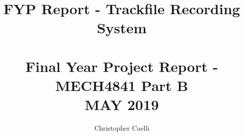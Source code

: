 \documentclass{UoNMCHA}
\numberwithin{equation}{section}
\begin{document}
\title{FYP Report - Trackfile Recording System \\ \ \\
{\small Final Year Project Report - MECH4841 Part B  \\MAY 2019}}
\author[UoNMCHA]{Christopher Caelli}
\address[UoNMCHA]{
Student of Mechatronics Engineering,\\
The University of Newcastle, Callaghan, NSW 2308, AUSTRALIA \\
Student Number: 3206246 \\
E-mail: \href{mailto:Christopher.Caelli@uon.edu.au}{\textsf{Christopher.Caelli@uon.edu.au}}}
\maketitle
\onecolumn

\vspace{-5mm}
\end{document}
